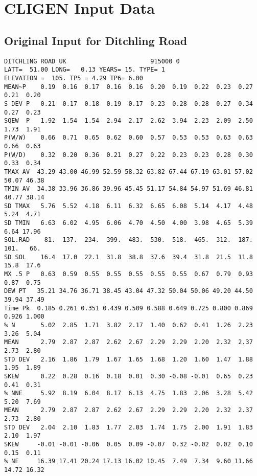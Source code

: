 \chapter{CLIGEN Input Data}
\label{sec:CLIGENInputData}

\section{Original Input for Ditchling Road}
\label{sec:OriginalInputForDitchlingRoadData}

\scriptsize

\begin{verbatim}
DITCHLING ROAD UK                       915000 0
LATT=  51.00 LONG=   0.13 YEARS= 15. TYPE= 1
ELEVATION =  105. TP5 = 4.29 TP6= 6.00
MEAN~P    0.19  0.16  0.17  0.16  0.16  0.20  0.19  0.22  0.23  0.27  0.21  0.20  
S DEV P   0.21  0.17  0.18  0.19  0.17  0.23  0.28  0.28  0.27  0.34  0.27  0.23
SQEW  P   1.92  1.54  1.54  2.94  2.17  2.62  3.94  2.23  2.09  2.50  1.73  1.91
P(W/W)    0.66  0.71  0.65  0.62  0.60  0.57  0.53  0.53  0.63  0.63  0.66  0.63
P(W/D)    0.32  0.20  0.36  0.21  0.27  0.22  0.23  0.23  0.28  0.30  0.33  0.34
TMAX AV  43.29 43.00 46.99 52.59 58.32 63.82 67.44 67.19 63.01 57.02 50.07 46.38
TMIN AV  34.38 33.96 36.86 39.96 45.45 51.17 54.84 54.97 51.69 46.81 40.77 38.14
SD TMAX   5.76  5.52  4.18  6.11  6.32  6.65  6.08  5.14  4.17  4.48  5.24  4.71
SD TMIN   6.63  6.02  4.95  6.06  4.70  4.50  4.00  3.98  4.65  5.39  6.64 17.96
SOL.RAD    81.  137.  234.  399.  483.  530.  518.  465.  312.  187.  101.   66.
SD SOL    16.4  17.0  22.1  31.8  38.8  37.6  39.4  31.8  21.5  11.8  15.8  17.6
MX .5 P   0.63  0.59  0.55  0.55  0.55  0.55  0.55  0.67  0.79  0.93  0.87  0.75
DEW PT   35.21 34.76 36.71 38.45 43.04 47.32 50.04 50.06 49.20 44.50 39.94 37.49
Time Pk  0.185 0.261 0.351 0.439 0.509 0.588 0.649 0.725 0.800 0.869 0.926 1.000 
% N       5.02  2.85  1.71  3.82  2.17  1.40  0.62  0.41  1.26  2.23  3.26  5.04
MEAN      2.79  2.87  2.87  2.62  2.67  2.29  2.29  2.20  2.32  2.37  2.73  2.80
STD DEV   2.16  1.86  1.79  1.67  1.65  1.68  1.20  1.60  1.47  1.88  1.95  1.89
SKEW      0.22  0.28  0.16  0.18  0.01  0.30 -0.08 -0.01  0.65  0.23  0.41  0.31
% NNE     5.92  8.19  6.04  8.17  6.13  4.75  1.83  2.06  3.28  5.42  5.20  7.69
MEAN      2.79  2.87  2.87  2.62  2.67  2.29  2.29  2.20  2.32  2.37  2.73  2.80
STD DEV   2.04  2.10  1.83  1.77  2.03  1.74  1.75  2.00  1.91  1.83  2.10  1.97
SKEW     -0.01 -0.01 -0.06  0.05  0.09 -0.07  0.32 -0.02  0.02  0.10  0.15  0.11
% NE     16.39 17.41 20.24 17.13 16.02 10.45  7.49  7.34  9.60 11.66 14.72 16.32

\end{verbatim}
